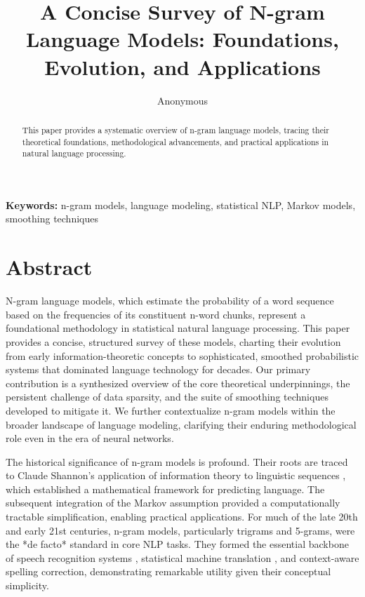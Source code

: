 \documentclass[10pt,a4paper]{article}
\title{ A Concise Survey of N-gram Language Models: Foundations, Evolution, and Applications }
\author{ Anonymous }
\date{}
\begin{document}
\maketitle

\begin{abstract}
This paper provides a systematic overview of n-gram language models, tracing their theoretical foundations, methodological advancements, and practical applications in natural language processing.
\end{abstract}


\noindent\textbf{Keywords:} n-gram models, language modeling, statistical NLP, Markov models, smoothing techniques



\section{ Abstract }
N-gram language models, which estimate the probability of a word sequence based on the frequencies of its constituent n-word chunks, represent a foundational methodology in statistical natural language processing. This paper provides a concise, structured survey of these models, charting their evolution from early information-theoretic concepts to sophisticated, smoothed probabilistic systems that dominated language technology for decades. Our primary contribution is a synthesized overview of the core theoretical underpinnings, the persistent challenge of data sparsity, and the suite of smoothing techniques developed to mitigate it. We further contextualize n-gram models within the broader landscape of language modeling, clarifying their enduring methodological role even in the era of neural networks.

The historical significance of n-gram models is profound. Their roots are traced to Claude Shannon's application of information theory to linguistic sequences \cite{anonndshannon1948}, which established a mathematical framework for predicting language. The subsequent integration of the Markov assumption provided a computationally tractable simplification, enabling practical applications. For much of the late 20th and early 21st centuries, n-gram models, particularly trigrams and 5-grams, were the *de facto* standard in core NLP tasks. They formed the essential backbone of speech recognition systems \cite{anonndjelinek1985}, statistical machine translation \cite{anonndbrown1993}, and context-aware spelling correction, demonstrating remarkable utility given their conceptual simplicity.
\end{document}
